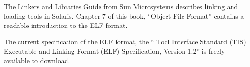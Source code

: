 \documentclass[a4paper,pdftex]{book}
\newcommand{\reg}{\textregistered\xspace}
\newcommand{\trade}{\texttrademark\xspace}
\begin{document}
The
\href{http://docsun.cites.uiuc.edu/sun_docs/C/solaris_9/SUNWdev/LLM/toc.html}{Linkers
  and Libraries Guide} from Sun Microsystems\reg describes linking and
loading tools in Solaris\trade.  Chapter 7 of this book, ``Object File
Format'' contains a readable introduction to the ELF format.

The current specification of the ELF format, the ``%
\href{http://www.x86.org/ftp/manuals/tools/elf.pdf}{Tool Interface
  Standard (TIS) Executable and Linking Format (ELF) Specification,
  Version 1.2}'' is freely available to download.

\backmatter

\printindex
\end{document}
